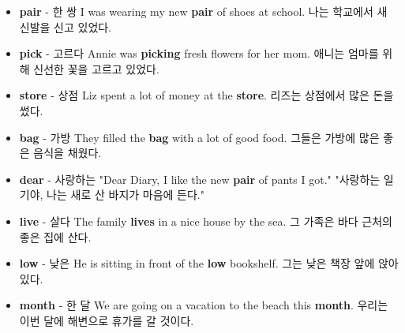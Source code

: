 \documentclass{article}
\begin{document}
\begin{addmargin}[1em]{1em}
\begin{itemize}
        \item \fontsize{12pt}{14pt}\selectfont \textbf{pair} - 한 쌍 \newline
        I was wearing my new \textbf{pair} of shoes at school. \newline
        나는 학교에서 새 신발을 신고 있었다.
        
        \item \fontsize{12pt}{14pt}\selectfont \textbf{pick} - 고르다 \newline
        Annie was \textbf{picking} fresh flowers for her mom. \newline
        애니는 엄마를 위해 신선한 꽃을 고르고 있었다.
        
        \item \fontsize{12pt}{14pt}\selectfont \textbf{store} - 상점 \newline
        Liz spent a lot of money at the \textbf{store}. \newline
        리즈는 상점에서 많은 돈을 썼다.
        
        \item \fontsize{12pt}{14pt}\selectfont \textbf{bag} - 가방 \newline
        They filled the \textbf{bag} with a lot of good food. \newline
        그들은 가방에 많은 좋은 음식을 채웠다.
        
        \item \fontsize{12pt}{14pt}\selectfont \textbf{dear} - 사랑하는 \newline
        "Dear Diary, I like the new \textbf{pair} of pants I got." \newline
        "사랑하는 일기야, 나는 새로 산 바지가 마음에 든다."
        
        \item \fontsize{12pt}{14pt}\selectfont \textbf{live} - 살다 \newline
        The family \textbf{lives} in a nice house by the sea. \newline
        그 가족은 바다 근처의 좋은 집에 산다.
        
        \item \fontsize{12pt}{14pt}\selectfont \textbf{low} - 낮은 \newline
        He is sitting in front of the \textbf{low} bookshelf. \newline
        그는 낮은 책장 앞에 앉아 있다.
        
        \item \fontsize{12pt}{14pt}\selectfont \textbf{month} - 한 달 \newline
        We are going on a vacation to the beach this \textbf{month}. \newline
        우리는 이번 달에 해변으로 휴가를 갈 것이다.
        

\end{itemize}
\end{addmargin}
\end{document}
